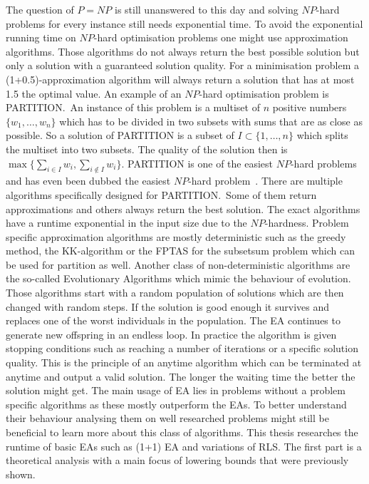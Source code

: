 The question of $P=NP$ is still unanswered to this day and solving $NP$-hard problems for every instance still needs exponential time.
To avoid the exponential running time on $NP$-hard optimisation problems one might use approximation algorithms.
Those algorithms do not always return the best possible solution but only a solution with a guaranteed solution quality.
For a minimisation problem a (1+0.5)-approximation algorithm will always return a solution that has at most 1.5 the optimal value.
An example of an $NP$-hard optimisation problem is PARTITION.\ 
An instance of this problem is a multiset of $n$ positive numbers $\{w_1,\dots,w_n\}$ which has to be divided in two subsets with sums that are as close as possible.
So a solution of PARTITION is a subset of $I\subset \{1,\dots,n\}$ which splits the multiset into two subsets.
The quality of the solution then is $\max\{\sum_{i\in I}w_i, \sum_{i\notin I}w_i\}$.
PARTITION is one of the easiest $NP$-hard problems and has even been dubbed the easiest $NP$-hard problem~\cite{hayes2002computing}.
There are multiple algorithms specifically designed for PARTITION.\ 
Some of them return approximations and others always return the best solution.
The exact algorithms have a runtime exponential in the input size due to the $NP$-hardness.
Problem specific approximation algorithms are mostly deterministic such as the greedy method, the KK-algorithm or the FPTAS for the subsetsum problem which can be used for partition as well.
Another class of non-deterministic algorithms are the so-called Evolutionary Algorithms which mimic the behaviour of evolution.
Those algorithms start with a random population of solutions which are then changed with random steps.
If the solution is good enough it survives and replaces one of the worst individuals in the population.
The EA continues to generate new offspring in an endless loop.
In practice the algorithm is given stopping conditions such as reaching a number of iterations or a specific solution quality.
This is the principle of an anytime algorithm which can be terminated at anytime and output a valid solution.
The longer the waiting time the better the solution might get.
The main usage of EA lies in problems without a problem specific algorithms as these mostly outperform the EAs.
To better understand their behaviour analysing them on well researched problems might still be beneficial to learn more about this class of algorithms.
This thesis researches the runtime of basic EAs such as (1+1) EA and variations of RLS.
The first part is a theoretical analysis with a main focus of lowering bounds that were previously shown.
